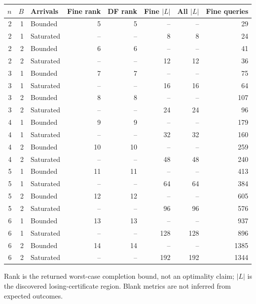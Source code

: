 \begin{tabular}{rrlrrrrr}
\toprule
$n$ & $B$ & Arrivals & Fine rank & DF rank & Fine $|L|$ & All $|L|$ & Fine queries \\
\midrule
2 & 1 & Bounded & 5 & 5 & -- & -- & 29 \\
2 & 1 & Saturated & -- & -- & 8 & 8 & 24 \\
2 & 2 & Bounded & 6 & 6 & -- & -- & 41 \\
2 & 2 & Saturated & -- & -- & 12 & 12 & 36 \\
3 & 1 & Bounded & 7 & 7 & -- & -- & 75 \\
3 & 1 & Saturated & -- & -- & 16 & 16 & 64 \\
3 & 2 & Bounded & 8 & 8 & -- & -- & 107 \\
3 & 2 & Saturated & -- & -- & 24 & 24 & 96 \\
4 & 1 & Bounded & 9 & 9 & -- & -- & 179 \\
4 & 1 & Saturated & -- & -- & 32 & 32 & 160 \\
4 & 2 & Bounded & 10 & 10 & -- & -- & 259 \\
4 & 2 & Saturated & -- & -- & 48 & 48 & 240 \\
5 & 1 & Bounded & 11 & 11 & -- & -- & 413 \\
5 & 1 & Saturated & -- & -- & 64 & 64 & 384 \\
5 & 2 & Bounded & 12 & 12 & -- & -- & 605 \\
5 & 2 & Saturated & -- & -- & 96 & 96 & 576 \\
6 & 1 & Bounded & 13 & 13 & -- & -- & 937 \\
6 & 1 & Saturated & -- & -- & 128 & 128 & 896 \\
6 & 2 & Bounded & 14 & 14 & -- & -- & 1385 \\
6 & 2 & Saturated & -- & -- & 192 & 192 & 1344 \\
\bottomrule
\end{tabular}
{\par\smallskip\footnotesize Rank is the returned worst-case completion bound, not an optimality claim; $|L|$ is the discovered losing-certificate region. Blank metrics are not inferred from expected outcomes.}
